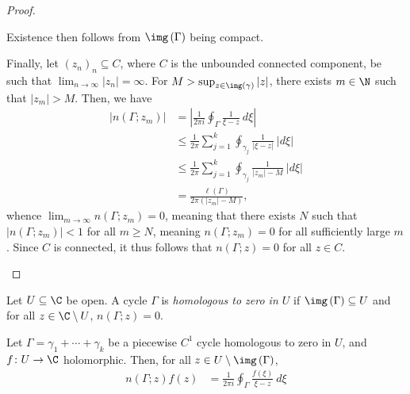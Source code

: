 \documentclass[10pt]{mypackage}
\begin{document}
\begin{proof}
\begin{enumerate}[(i)]
      Existence then follows from $\img\left( \Gamma \right)$ being compact.%

      Finally, let $\left( z_n \right)_n\subseteq C$, where $C$ is the unbounded connected component, be such that $\lim_{n\rightarrow\infty} \left\vert z_n \right\vert = \infty$. For $M > \sup_{z\in\img\left( \gamma \right)}\left\vert z \right\vert$, there exists $m\in \N$ such that $\left\vert z_m \right\vert > M$. Then, we have
      \begin{align*}
        \left\vert n\left( \Gamma;z_m \right) \right\vert &= \left\vert \frac{1}{2\pi i} \oint_{\Gamma}^{} \frac{1}{\xi-z}\:d\xi \right\vert\\
                                                          &\leq \frac{1}{2\pi} \sum_{j=1}^{k} \oint_{\gamma_j}^{} \frac{1}{\left\vert \xi-z \right\vert}\:\left\vert d\xi \right\vert\\
                                                          &\leq \frac{1}{2\pi} \sum_{j=1}^{k} \oint_{\gamma_j}^{} \frac{1}{\left\vert z_m \right\vert - M}\:\left\vert d\xi \right\vert\\
                                                          &= \frac{\ell\left( \Gamma \right)}{2\pi \left( \left\vert z_m \right\vert - M \right)},
      \end{align*}
      whence $\lim_{m\rightarrow\infty} n\left( \Gamma;z_m \right) = 0$, meaning that there exists $N$ such that $\left\vert n\left( \Gamma;z_m \right) \right\vert < 1$ for all $m\geq N$, meaning $n\left( \Gamma;z_m \right) = 0$ for all sufficiently large $m$. Since $C$ is connected, it thus follows that $n\left( \Gamma;z \right) = 0$ for all $z\in C$.
  \end{enumerate}
\end{proof}
\begin{definition}
  Let $U\subseteq \C$ be open. A cycle $\Gamma$ is \textit{homologous to zero in $U$} if $\img\left( \Gamma \right)\subseteq U$ and for all $z\in \C\setminus U$, $n\left( \Gamma;z \right) = 0$.
\end{definition}
\begin{theorem}
  Let $\Gamma = \gamma_1 + \cdots + \gamma_k$ be a piecewise $C^1$ cycle homologous to zero in $U$, and $f\colon U\rightarrow \C$ holomorphic. Then, for all $z\in U\setminus \img\left( \Gamma \right)$,
  \begin{align*}
    n\left( \Gamma;z \right)f\left( z \right) &= \frac{1}{2\pi i} \oint_{\Gamma}^{} \frac{f\left( \xi \right)}{\xi - z}\:d\xi
  \end{align*}
\end{theorem}
\end{document}
